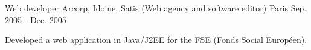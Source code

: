 \begin{cventries}
  \cventry
    {Web developer} %
    {Arcorp, Idoine, Satis (Web agency and software editor)} %
    {Paris} %
    {Sep. 2005 - Dec. 2005} %
    {
      \begin{cvitems} %
        \item {Developed a web application in Java/J2EE for the FSE (Fonds Social Européen).}
      \end{cvitems}
    }

\end{cventries}
